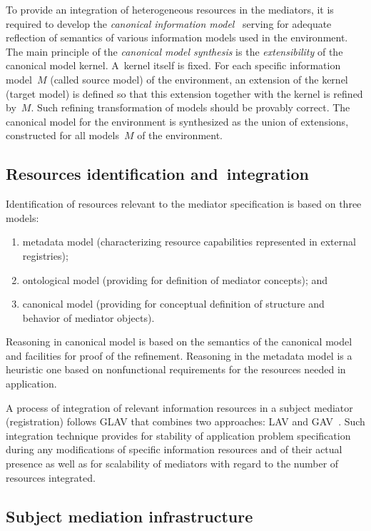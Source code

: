 \begin{multicols}{2}
\noindent
To provide an integration of heterogeneous resources in the mediators, it is required to develop the 
\textit{canonical information model}~\cite{3kal} serving for adequate reflection of semantics of 
various information models used in the environment. The main principle of the \textit{canonical 
model synthesis} is the \textit{extensibility} of the canonical model kernel. A~kernel itself is fixed. 
For each specific information model~$M$ (called source model) of the environment, an extension of 
the kernel (target model) is defined so that this extension together with the kernel is refined 
by~$M$. Such refining transformation of models should be provably correct. The canonical model 
for the environment is synthesized as the union of extensions, constructed for all models~$M$ of 
the environment.

\subsection{Resources identification and~integration}

\noindent
Identification of resources relevant to the mediator specification is based on three models: 
\begin{enumerate}[($i$)]
\item metadata model (characterizing resource capabilities represented in external registries); 
\item ontological model (providing for definition of mediator concepts); and 
\item canonical model (providing 
for conceptual definition of structure and behavior of mediator objects). 
\end{enumerate}

Reasoning in canonical 
model is based on the semantics of the canonical model and facilities for proof of the refinement. 
Reasoning in the metadata model is a heuristic one based on nonfunctional requirements for the 
resources needed in application.

A process of integration of relevant information resources in a subject mediator (registration) 
follows GLAV that combines two approaches: LAV and GAV~\cite{4kal}. 
Such integration technique provides for stability of application problem 
specification during any modifications of specific information resources and of their actual 
presence as well as for scalability of mediators with regard to
the number of resources integrated.

\subsection{Subject mediation infrastructure}


\end{multicols}
